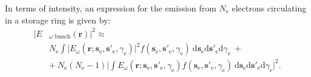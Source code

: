 \documentclass{iucr}              %
\begin{document}
In terms of intensity, an expression for the emission from $N_\text{e}$ electrons circulating in a storage ring is given by: 
\begin{equation}
\begin{split}
|E&_{\omega\text{~bunch}}(\textbf{r})|^2 \approx \\
 &N_\text{e} \int\big| E_\omega(\textbf{r};\textbf{s}_\text{e}, \textbf{s}'_\text{e}, \gamma_\text{e})\big|^2 f(\textbf{s}_\text{e}, \textbf{s}'_\text{e}, \gamma_\text{e})~ \text{d}\textbf{s}_\text{e} \text{d}\textbf{s}'_\text{e} \text{d}\gamma_\text{e}~+\\
&+~ N_\text{e}(N_\text{e}-1)\bigg| \int E_\omega(\textbf{r};\textbf{s}_\text{e}, \textbf{s}'_\text{e}, \gamma_\text{e}) f(\textbf{s}_\text{e}, \textbf{s}'_\text{e}, \gamma_\text{e})~ \text{d}\textbf{s}_\text{e} \text{d}\textbf{s}'_\text{e} \text{d}\gamma_\text{e} \bigg|^2.
\end{split}
\label{eq:SR}
\end{equation}



\end{document}
